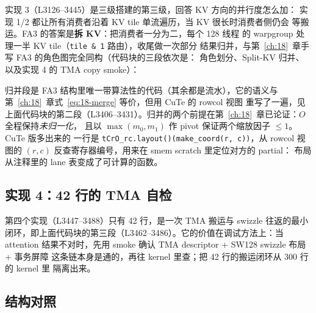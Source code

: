 实现 3（L3126--3445）是三级搭建的第三级，回答 KV 方向的并行度怎么加：
实现 1/2 都让所有消费者沿着 KV tile 单流遍历，当 KV 很长时消费者侧仍会
等搬运。FA3 的答案是\textbf{拆 KV}：把消费者一分为二，每个 128 线程
的 warpgroup 处理一半 KV tile（\texttt{tile \& 1} 路由），收尾做一次部分
结果归并，与第~\ref{ch:18}~章手写 FA3 的角色图完全同构（代码块的三段依次是：
角色划分、Split-KV 归并、以及实现 4 的 TMA copy smoke）：



归并段是 FA3 结构里唯一带算法性的代码（其余都是流水），它的语义与
第~\ref{ch:18}~章式~\ref{eq:18-merge} 等价，但用 CuTe 的 rowcol 视图
重写了一遍，见上面代码块的第二段（L3406--3431）。归并的两个前提在第~\ref{ch:18}~章已论证：$O$ 全程保持\emph{未归一化}，
且以 $\max(m_0,m_1)$ 作 pivot 保证两个缩放因子 $\le 1$。CuTe 版多出来的
一行是 \texttt{tCrO\_\allowbreak{}rc.layout\allowbreak{}()\allowbreak{}(make\_\allowbreak{}coord\allowbreak{}(r,\allowbreak{} c))}，从 rowcol 视图的
$(r,c)$ 反查寄存器编号，用来在 smem scratch 里定位对方的 partial：
布局从注释里的 lane 表变成了可计算的函数。

\subsection{实现 4：42 行的 TMA 自检}

第四个实现（L3447--3488）只有 42 行，是一次 TMA 搬运与 swizzle 往返的最小
闭环，即上面代码块的第三段（L3462--3486）。它的价值在调试方法上：当 attention
结果不对时，先用 smoke 确认 TMA descriptor + SW128 swizzle 布局 + 事务屏障
这条链本身是通的，再往 kernel 里查；把 42 行的搬运闭环从 300 行的 kernel 里
隔离出来。

\subsection{结构对照}

